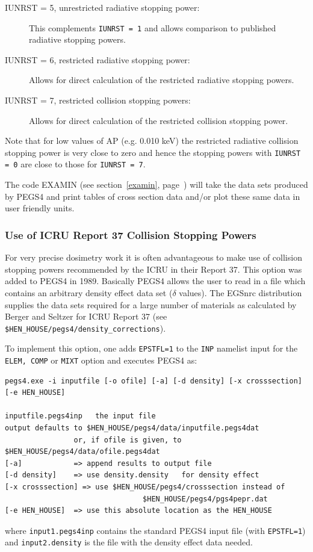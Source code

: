 \begin{description}
\item[IUNRST = 5, unrestricted radiative stopping power:] This complements
{\tt IUNRST = 1} and allows comparison to published radiative stopping powers.

\item[IUNRST = 6, restricted radiative stopping power:] Allows for direct
calculation of the restricted radiative stopping powers.

\item[IUNRST = 7, restricted collision stopping powers:] Allows for direct
calculation of the restricted collision stopping power.
\end{description}
Note that for low values of AP (e.g. 0.010 keV) the restricted radiative
collision stopping power is very close to zero and hence the stopping
powers with {\tt IUNRST = 0} are close to those for {\tt IUNRST = 7}.

The code EXAMIN (see section~\ref{examin}, page~\pageref{examin}) will take
the data sets produced by PEGS4 and print tables of cross section data
and/or plot these same data in user friendly units.

\subsubsection{Use of ICRU Report 37 Collision Stopping Powers}
\label{icru37_csp}
For very precise dosimetry work it is often advantageous to make use of
collision stopping powers recommended by the ICRU in their Report
37\cite{ICRU37}.  This option was added to PEGS4 in 1989\cite{Du89}.
Basically PEGS4 allows the user to read in a file which contains an arbitrary
density effect data set ($\delta$ values). The EGSnrc distribution
supplies the data sets
required for a large number of materials as calculated by Berger and
Seltzer\cite{BS83} for ICRU Report 37 (see
\verb+$HEN_HOUSE/pegs4/density_corrections+).
 

To implement this option, one adds {\tt EPSTFL=1} to the {\tt INP}
namelist input for the {\tt ELEM, COMP} or {\tt MIXT} option
and executes PEGS4 as:
\begin{verbatim}
pegs4.exe -i inputfile [-o ofile] [-a] [-d density] [-x crosssection] [-e HEN_HOUSE]

inputfile.pegs4inp   the input file
output defaults to $HEN_HOUSE/pegs4/data/inputfile.pegs4dat
                or, if ofile is given, to $HEN_HOUSE/pegs4/data/ofile.pegs4dat
[-a]            => append results to output file
[-d density]    => use density.density   for density effect
[-x crosssection] => use $HEN_HOUSE/pegs4/crosssection instead of
                                $HEN_HOUSE/pegs4/pgs4pepr.dat
[-e HEN_HOUSE]  => use this absolute location as the HEN_HOUSE
\end{verbatim}
where {\tt input1.pegs4inp} contains the standard PEGS4 input file (with
{\tt EPSTFL=1}) and {\tt  input2.density} is the file with the density effect
data needed.

